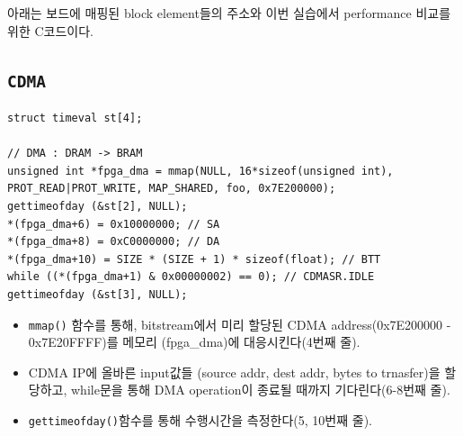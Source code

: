 \documentclass{article}
\begin{document}
아래는 보드에 매핑된 block element들의 주소와 이번 실습에서 performance 비교를 위한 C코드이다.
\subsection*{\texttt{CDMA}}
\begin{lstlisting}[style={c-style}]
struct timeval st[4];

// DMA : DRAM -> BRAM
unsigned int *fpga_dma = mmap(NULL, 16*sizeof(unsigned int), PROT_READ|PROT_WRITE, MAP_SHARED, foo, 0x7E200000);
gettimeofday (&st[2], NULL);
*(fpga_dma+6) = 0x10000000; // SA
*(fpga_dma+8) = 0xC0000000; // DA
*(fpga_dma+10) = SIZE * (SIZE + 1) * sizeof(float); // BTT
while ((*(fpga_dma+1) & 0x00000002) == 0); // CDMASR.IDLE
gettimeofday (&st[3], NULL);
\end{lstlisting}
\begin{itemize}
    \item  \texttt{mmap()} 함수를 통해, bitstream에서 미리 할당된 CDMA address(0x7E200000 - 0x7E20FFFF)를 메모리 (fpga\_dma)에 대응시킨다(4번째 줄).
    \item CDMA IP에 올바른 input값들 (source addr, dest addr, bytes to trnasfer)을 할당하고, while문을 통해 DMA operation이 종료될 때까지 기다린다(6-8번째 줄).
    \item \texttt{gettimeofday()}함수를 통해 수행시간을 측정한다(5, 10번째 줄).
\end{itemize}
\end{document}
